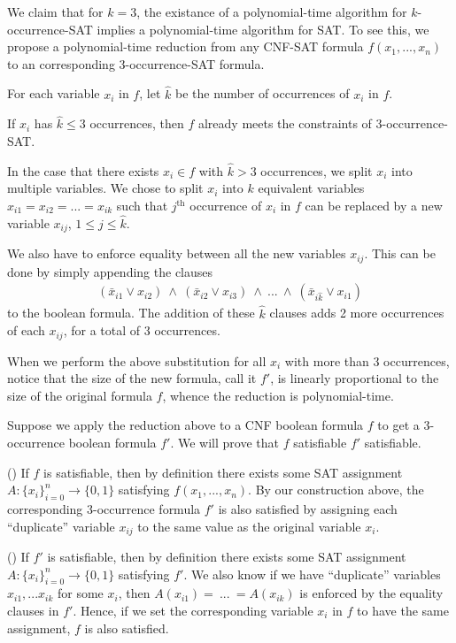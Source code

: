 \documentclass{article}
\begin{document}
\begin{solution} %
We claim that for $k=3$, the existance of a polynomial-time algorithm for $k$-occurrence-SAT implies a polynomial-time algorithm for SAT. To see this, we propose a polynomial-time reduction from any CNF-SAT formula $f(x_1, ..., x_n)$ to an corresponding 3-occurrence-SAT formula.

\begin{subproof}[Reduction.]
For each variable $x_i$ in $f$, let $\hat k$ be the number of occurrences of $x_i$ in $f$.

If $x_i$ has $\hat k \leq 3$ occurrences, then $f$ already meets the constraints of 3-occurrence-SAT.

In the case that there exists $x_i\in f$ with $\hat k > 3$ occurrences, we split $x_i$ into multiple variables.
We chose to split $x_i$ into $k$ equivalent variables $x_{i1} = x_{i2} =  ... = x_{ik}$ such that $j^{\text{th}}$ occurrence of $x_i$ in $f$ can be replaced by a new variable $x_{ij}$, $1 \leq j \leq \hat k$.

We also have to enforce equality between all the new variables $x_{ij}$.
This can be done by simply appending the clauses
\begin{align*}
    (\bar{x}_{i1} \lor x_{i2}) \ \land \ (\bar{x}_{i2} \lor x_{i3}) \ \land \ ... \ \land \ (\bar{x}_{i\hat k} \lor x_{i1})
\end{align*}
to the boolean formula. The addition of these $\hat k$ clauses adds 2 more occurrences of each $x_{ij}$, for a total of 3 occurrences.

When we perform the above substitution for all $x_i$ with more than 3 occurrences, notice that the size of the new formula, call it $f'$, is linearly proportional to the size of the original formula $f$, whence the reduction is polynomial-time.
\end{subproof}



\begin{subproof}[Correctness.]
Suppose we apply the reduction above to a CNF boolean formula $f$ to get a 3-occurrence boolean formula $f'$. We will prove that $f$ satisfiable \iff $f'$ satisfiable.

(\imp) If $f$ is satisfiable, then by definition there exists some SAT assignment $A: \{x_i\}_{i=0}^n \rightarrow \{0,1\}$ satisfying $f(x_1,..., x_n)$. By our construction above, the corresponding 3-occurrence formula $f'$ is also satisfied by assigning each ``duplicate'' variable $x_{ij}$ to the same value as the original variable $x_i$.

(\pmi) If $f'$ is satisfiable, then by definition there exists some SAT assignment $A: \{x_i\}_{i=0}^n \rightarrow \{0,1\}$ satisfying $f'$.
We also know if we have ``duplicate'' variables $x_{i1}, ... x_{ik}$ for some $x_i$, then $A(x_{i1}) = \ ... \ = A(x_{ik})$ is enforced by the equality clauses in $f'$. Hence, if we set the corresponding variable $x_i$ in $f$ to have the same assignment, $f$ is also satisfied.
\end{subproof}

\end{solution}
\pagebreak
\end{document}
